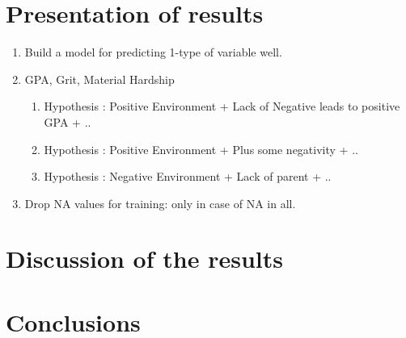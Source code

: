 \documentclass{article} %
\begin{document}
\section{Presentation of results}

\begin{enumerate}
	\item Build a model for predicting 1-type of variable well.
	\item GPA, Grit, Material Hardship
	\begin{enumerate}
		\item Hypothesis : Positive Environment + Lack of Negative leads to positive GPA + ..
		\item Hypothesis : Positive Environment + Plus some negativity + ..
		\item Hypothesis : Negative Environment + Lack of parent + ..
	\end{enumerate}
	\item Drop NA values for training: only in case of NA in all.
\end{enumerate}
\section{Discussion of the results}
\section{Conclusions}


\end{document}
